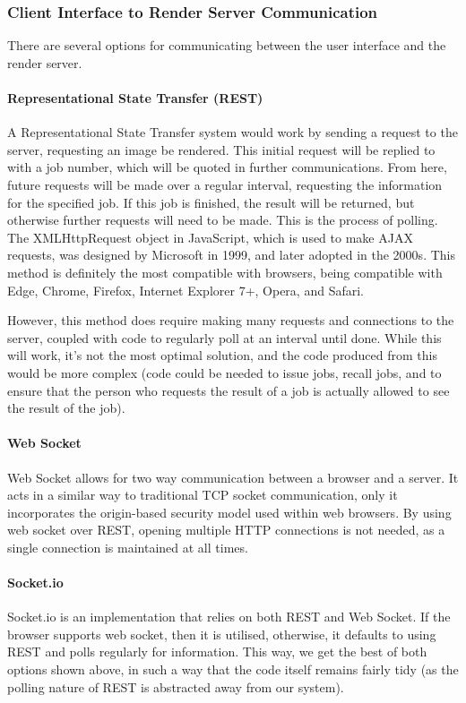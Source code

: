 \documentclass[12pt,a4paper]{article}
\begin{document}
  \subsubsection{Client Interface to Render Server Communication}
There are several options for communicating between the user interface and the render server.

\paragraph{Representational State Transfer (REST)}
A Representational State Transfer system would work by sending a request to the server, requesting an image be rendered. This initial request will be replied to with a job number, which will be quoted in further communications. From here, future requests will be made
over a regular interval, requesting the information for the specified job. If this job is finished, the result will be returned, but otherwise further requests will need to be made. This is the process
of polling.
The XMLHttpRequest object in JavaScript, which is used to make AJAX requests, was designed by Microsoft
in 1999, and later adopted in the 2000s.
This method is definitely the most compatible with browsers, being compatible with Edge, Chrome, Firefox, Internet Explorer 7+, Opera, and Safari. \cite{XMLHttpRequestMozilla}

However, this method does require making many requests and connections to the server, coupled with code to regularly poll at an interval until done. While this will work, it's not the most
optimal solution, and the code produced from this would be more complex (code could be needed to issue jobs, recall jobs,
and to ensure that the person who requests the result of a job is actually allowed to see the result of the job).

\paragraph{Web Socket}
Web Socket allows for two way communication between a browser and a server. It acts in a similar way to traditional TCP socket communication, only it incorporates the origin-based security model used within web browsers. By using web socket over REST, opening multiple HTTP connections is not needed, as a single connection is maintained at all times. \cite{WebSocketProtocol}

\paragraph{Socket.io}
Socket.io is an implementation that relies on both REST and Web Socket. If the browser supports web socket, then it is utilised, otherwise, it defaults to using REST and polls regularly for information. This way, we get the best of both options shown above, in such a way that the code itself remains fairly tidy (as the polling nature of REST is abstracted away from our system).
\end{document}
